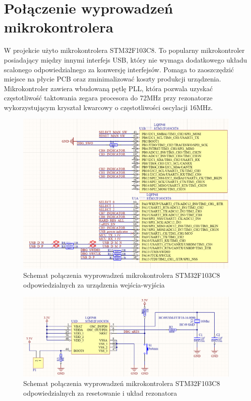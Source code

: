 \section{Połączenie wyprowadzeń mikrokontrolera}

W projekcie użyto  mikrokontrolera STM32F103C8. To popularny mikrokontroler posiadający między innymi interfejs USB, który nie wymaga dodatkowego układu scalonego odpowiedzialnego za konwersję interfejsów. Pomaga to zaoszczędzić miejsce na płycie PCB oraz zminimalizować koszty produkcji urządzenia. Mikrokontroler zawiera wbudowaną pętlę PLL, która pozwala uzyskać częstotliwość taktowania zegara procesora do 72MHz przy rezonatorze wykorzystującym kryształ kwarcowy o częstotliwości oscylacji 16MHz.

\begin{figure}[H]
    \centering
    \includegraphics[width=0.65\paperwidth]{images/MCU_STM32.png}
    \caption{Schemat połączenia wyprowadzeń mikrokontrolera STM32F103C8 odpowiedzialnych za urządzenia wejścia-wyjścia}
    \label{MCU_STM32}
\end{figure}

\begin{figure}[H]
    \centering
    \includegraphics[width=0.65\paperwidth]{images/MCU_oscillator_and_reset.png}
    \centering
    \caption{Schemat połączenia wyprowadzeń mikrokontrolera STM32F103C8 odpowiedzialnych za resetowanie i układ rezonatora}
    \label{MCU_STM32_osc_and_reset}
\end{figure}

